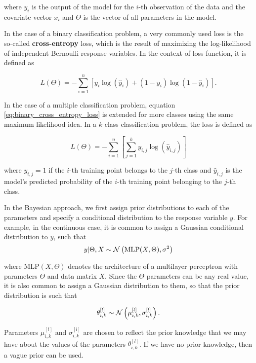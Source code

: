 where $\hat{y_i}$ is the output of the model for the $i$-th observation of the data and the covariate vector $x_i$ and $\Theta$ is the vector of all parameters in the model.

In the case of a binary classification problem, a very commonly used loss is the so-called \textbf{cross-entropy} loss, which is the result of maximizing the log-likelihood of independent Bernoulli response variables. In the context of loss function, it is defined as

\begin{equation}
  \label{eq:binary_cross_entropy_loss}
  L(\Theta) = - \sum_{i = 1}^n \left[ y_i \log{\left( \hat{y}_i \right)} + (1 - y_i) \log{\left( 1 - \hat{y}_i \right)} \right].
\end{equation}

In the case of a multiple classification problem, equation \ref{eq:binary_cross_entropy_loss} is extended for more classes using the same maximum likelihood idea. In a $k$ class classification problem, the loss is defined as

\begin{equation*}
  L(\Theta) = - \sum_{i = 1}^n \left[ \sum_{j = 1}^k y_{i,j} \log{\left( \hat{y}_{i,j} \right)}  \right]
\end{equation*}

where $y_{i,j} = 1$ if the $i$-th training point belongs to the $j$-th class and $\hat{y}_{i,j}$ is the model's predicted probability of the $i$-th training point belonging to the $j$-th class.

In the Bayesian approach, we first assign prior distributions to each of the parameters and specify a conditional distribution to the response variable $y$. For example, in the continuous case, it is common to assign a Gaussian conditional distribution to $y$, such that
$$
  y | \Theta, X \sim \mathcal{N}\left( \mathrm{MLP}(X, \Theta), \sigma^2 \right)
$$

where $\mathrm{MLP}(X, \Theta)$ denotes the architecture of a multilayer perceptron with parameters $\Theta$ and data matrix $X$. Since the $\Theta$ parameters can be any real value, it is also common to assign a Gaussian distribution to them, so that the prior distribution is such that

$$
  \theta_{i,k}^{[l]} \sim \mathcal{N}\left( \mu_{i,k}^{[l]}, \sigma_{i,k}^{[l]} \right).
$$

Parameters $\mu_{i,k}^{[l]}$ and $\sigma_{i,k}^{[l]}$ are chosen to reflect the prior knowledge that we may have about the values of the parameters $\theta_{i,k}^{[l]}$. If we have no prior knowledge, then a vague prior can be used.

